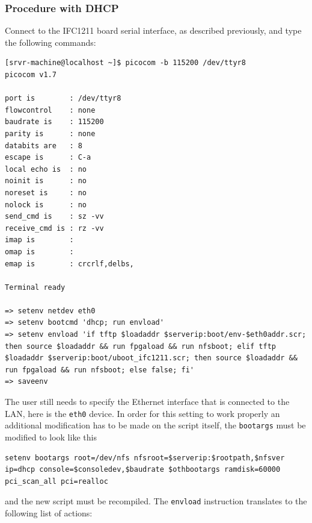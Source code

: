 \documentclass[11pt
  , a4paper
  , article
  , oneside
  , showtrims
]{memoir}
\begin{document}
\subsubsection{Procedure with DHCP}
Connect to the IFC1211 board serial interface, as described previously, and type the following commands:

\begin{lstlisting}[style=termstyle]
[srvr-machine@localhost ~]$ picocom -b 115200 /dev/ttyr8
picocom v1.7

port is        : /dev/ttyr8
flowcontrol    : none
baudrate is    : 115200
parity is      : none
databits are   : 8
escape is      : C-a
local echo is  : no
noinit is      : no
noreset is     : no
nolock is      : no
send_cmd is    : sz -vv
receive_cmd is : rz -vv
imap is        : 
omap is        : 
emap is        : crcrlf,delbs,

Terminal ready

=> setenv netdev eth0
=> setenv bootcmd 'dhcp; run envload'
=> setenv envload 'if tftp $loadaddr $serverip:boot/env-$eth0addr.scr; then source $loadaddr && run fpgaload && run nfsboot; elif tftp $loadaddr $serverip:boot/uboot_ifc1211.scr; then source $loadaddr && run fpgaload && run nfsboot; else false; fi'
=> saveenv
\end{lstlisting}

The user still needs to specify the Ethernet interface that is connected to the LAN, here is the \texttt{eth0} device.
In order for this setting to work properly an additional modification has to be made on the script itself, the \texttt{bootargs} must be modified to look like this
\begin{lstlisting}[style=texteditor]
setenv bootargs root=/dev/nfs nfsroot=$serverip:$rootpath,$nfsver ip=dhcp console=$consoledev,$baudrate $othbootargs ramdisk=60000 pci_scan_all pci=realloc
\end{lstlisting}
and the new script must be recompiled.
\newline
\newline
\newline
The \texttt{envload} instruction translates to the following list of actions:
\end{document}
